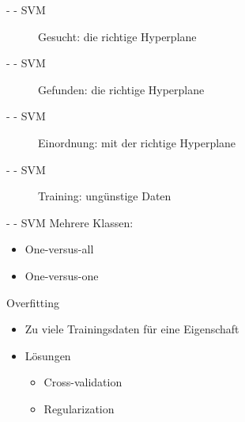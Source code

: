 \documentclass[fleqn,11pt,aspectratio=43]{beamer}
\begin{document}
\begin{frame}{\insertsectionhead - \insertsubsectionhead - SVM}
\begin{figure}
\scalebox{.7}{}
\caption{Gesucht: die richtige Hyperplane}
\end{figure}
\end{frame}

\begin{frame}{\insertsectionhead - \insertsubsectionhead - SVM}
\begin{figure}
\scalebox{.8}{}
\caption{Gefunden: die richtige Hyperplane}
\end{figure}
\end{frame}

\begin{frame}{\insertsectionhead - \insertsubsectionhead - SVM}
\begin{figure}
\scalebox{.8}{}
\caption{Einordnung: mit der richtige Hyperplane}
\end{figure}
\end{frame}

\begin{frame}{\insertsectionhead - \insertsubsectionhead - SVM}
\begin{figure}
\scalebox{1.0}{}
\caption{Training: ungünstige Daten}
\end{figure}
\end{frame}

\begin{frame}{\insertsectionhead - \insertsubsectionhead - SVM\cite{dwh}}
Mehrere Klassen:
\begin{itemize}
\item One-versus-all
\item One-versus-one
\end{itemize}

Overfitting
\begin{itemize}
\item Zu viele Trainingsdaten für eine Eigenschaft
\item Lösungen
\begin{itemize}
\item Cross-validation
\item Regularization
\end{itemize} 
\end{itemize}
\end{frame}
\end{document}
